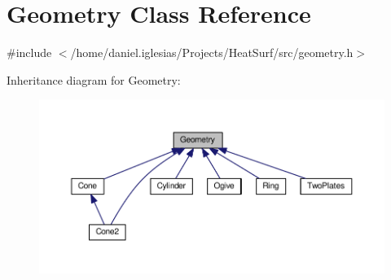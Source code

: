 \hypertarget{classGeometry}{\section{Geometry Class Reference}
\label{classGeometry}
}


{\ttfamily \#include $<$/home/daniel.\-iglesias/\-Projects/\-Heat\-Surf/src/geometry.\-h$>$}



Inheritance diagram for Geometry\-:\nopagebreak
\begin{figure}[H]
\begin{center}
\leavevmode
\includegraphics[width=350pt]{classGeometry__inherit__graph}
\end{center}
\end{figure}

